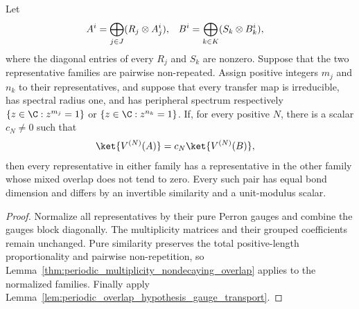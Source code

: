 \begin{lemma}
    \label{thm:periodic_spectral_multiplicity_nondecaying_overlap}
    \leanok
    Let
    \begin{align}
        A^i & =\bigoplus_{j\in J}(R_j\otimes A_j^i), &
        B^i & =\bigoplus_{k\in K}(S_k\otimes B_k^i),
        \notag
    \end{align}
    where the diagonal entries of every $R_j$ and $S_k$ are nonzero.  Suppose
    that the two representative families are pairwise non-repeated.  Assign
    positive integers $m_j$ and $n_k$ to their representatives, and suppose
    that every transfer map is irreducible, has spectral radius one, and has
    peripheral spectrum respectively
    $\{z\in\C:z^{m_j}=1\}$ or $\{z\in\C:z^{n_k}=1\}$.  If, for every positive
    $N$, there is a scalar $c_N\ne0$ such that
    \begin{align}
        \ket{V^{(N)}(A)} & =c_N\ket{V^{(N)}(B)},
        \notag
    \end{align}
    then every representative in either family has a representative in the
    other family whose mixed overlap does not tend to zero.  Every such pair
    has equal bond dimension and differs by an invertible similarity and a
    unit-modulus scalar.
\end{lemma}
\begin{proof}
    \leanok
    Normalize all representatives by their pure Perron gauges and combine
    the gauges block diagonally.  The multiplicity matrices and their grouped
    coefficients remain unchanged.  Pure similarity preserves the total
    positive-length proportionality and pairwise non-repetition, so
    Lemma~\ref{thm:periodic_multiplicity_nondecaying_overlap} applies to the
    normalized families.  Finally apply
    Lemma~\ref{lem:periodic_overlap_hypothesis_gauge_transport}.
\end{proof}

